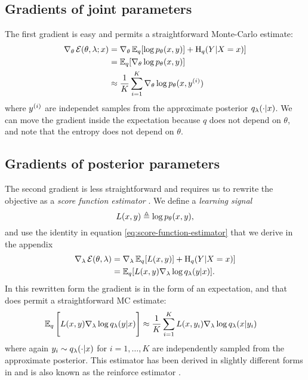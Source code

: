  \subsection{Gradients of joint parameters}
    The first gradient is easy and permits a straightforward Monte-Carlo estimate:
    \begin{align*}
      \nabla_{\theta} \operatorname{\mathcal{E}}(\theta, \lambda; x)
        &= \nabla_{\theta} \operatorname{\mathbb{E}}_q [ \log p_{\theta}(x, y) ]  + \operatorname{H}_q( Y | X = x) ] \\
        &= \operatorname{\mathbb{E}}_q [ \nabla_{\theta} \log p_{\theta}(x, y) ] \\
        &\approx \frac{1}{K}\sum_{i=1}^K  \nabla_{\theta} \log p_{\theta}(x, y^{(i)})
    \end{align*}
    where $y^{(i)}$ are independet samples from the approximate posterior $q_{\lambda}( \cdot | x)$. We can move the gradient inside the expectation because $q$ does not depend on $\theta$, and note that the entropy does not depend on $\theta$.

  \subsection{Gradients of posterior parameters}
    The second gradient is less straightforward and requires us to rewrite the objective as a \textit{score function estimator} \citep{fu2006gradient}.  We define a \textit{learning signal}
    \begin{equation}
      L(x, y) \triangleq \log p_{\theta}(x, y),
    \end{equation}
    and use the identity in equation \ref{eq:score-function-estimator} that we derive in the appendix
    \begin{align*}
      \nabla_{\lambda} \operatorname{\mathcal{E}}(\theta, \lambda)
        &= \nabla_{\lambda} \operatorname{\mathbb{E}}_q [ L(x, y) ] + \operatorname{H}_q( Y | X = x) ] \\
        &= \operatorname{\mathbb{E}}_q [ L(x, y) \nabla_{\lambda} \log q_{\lambda}(y | x) ].
    \end{align*}
    In this rewritten form the gradient is in the form of an expectation, and that does permit a straightforward MC estimate:
    \begin{align}
      \operatorname{\mathbb{E}}_q \Bigg[ L(x, y) \nabla_{\lambda} \log q_{\lambda}(y | x) \Bigg]
        &\approx \frac{1}{K}\sum_{i=1}^K  L(x, y_i)\nabla_{\lambda} \log q_{\lambda}(x | y_i)
    \end{align}
    where again $y_i \sim q_{\lambda}(\cdot | x)$ for $i=1,\dots,K$ are independently sampled from the approximate posterior. This estimator has been derived in slightly different forms in \citet{williams1992reinforce,paisley2012viss,mnih2014nvil,ranganath2014black,miao2016discrete} and is also known as the reinforce estimator \citep{williams1992reinforce}.

